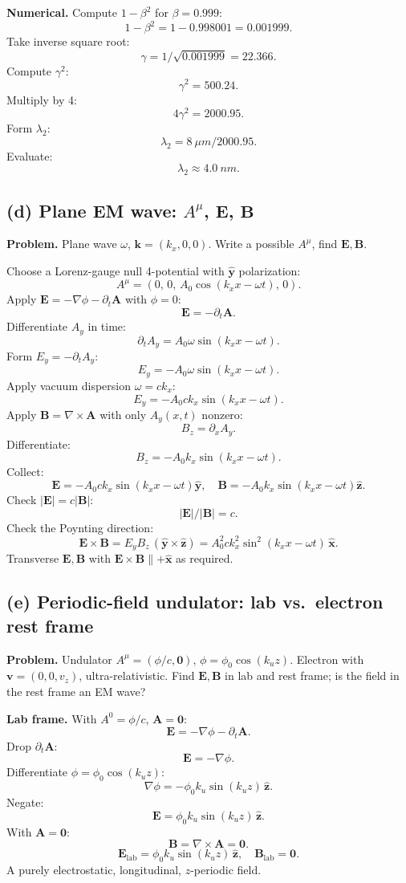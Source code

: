 \documentclass[11pt]{article}
\begin{document}
\noindent\textbf{Numerical.} Compute $1-\beta^2$ for $\beta=0.999$:
\[ 1-\beta^2 = 1-0.998001 = 0.001999. \]
Take inverse square root:
\[ \gamma = 1/\sqrt{0.001999} = 22.366. \]
Compute $\gamma^2$:
\[ \gamma^2 = 500.24. \]
Multiply by 4:
\[ 4\gamma^2 = 2000.95. \]
Form $\lambda_2$:
\[ \lambda_2 = \SI{8}{\mu m}/2000.95. \]
Evaluate:
\[ \boxed{\;\lambda_2 \approx \SI{4.0}{nm}.\;} \]

\subsection*{(d) Plane EM wave: $A^\mu$, $\bm E$, $\bm B$}

\textbf{Problem.} Plane wave $\omega$, $\bm k=(k_x,0,0)$. Write a possible $A^\mu$, find $\bm E,\bm B$.

Choose a Lorenz-gauge null 4-potential with $\hat{\bm y}$ polarization:
\[ A^\mu = (0,\, 0,\, A_0\cos(k_x x - \omega t),\, 0). \]
Apply $\bm E = -\nabla\phi - \partial_t\bm A$ with $\phi=0$:
\[ \bm E = -\partial_t\bm A. \]
Differentiate $A_y$ in time:
\[ \partial_t A_y = A_0\omega\sin(k_x x-\omega t). \]
Form $E_y = -\partial_t A_y$:
\[ E_y = -A_0\omega\sin(k_x x-\omega t). \]
Apply vacuum dispersion $\omega = ck_x$:
\[ E_y = -A_0 c k_x \sin(k_x x-\omega t). \]
Apply $\bm B = \nabla\times\bm A$ with only $A_y(x,t)$ nonzero:
\[ B_z = \partial_x A_y. \]
Differentiate:
\[ B_z = -A_0 k_x \sin(k_x x-\omega t). \]
Collect:
\[ \boxed{\;\bm E = -A_0 c k_x \sin(k_x x-\omega t)\hat{\bm y},\quad \bm B = -A_0 k_x \sin(k_x x-\omega t)\hat{\bm z}.\;} \]
Check $|\bm E|=c|\bm B|$:
\[ |\bm E|/|\bm B| = c. \]
Check the Poynting direction:
\[ \bm E\times\bm B = E_y B_z\,(\hat{\bm y}\times\hat{\bm z}) = A_0^2 c k_x^2\sin^2(k_x x-\omega t)\,\hat{\bm x}. \]
Transverse $\bm E,\bm B$ with $\bm E\times\bm B \parallel +\hat{\bm x}$ as required.

\subsection*{(e) Periodic-field undulator: lab vs.\ electron rest frame}

\textbf{Problem.} Undulator $A^\mu = (\phi/c,\bm 0)$, $\phi=\phi_0\cos(k_u z)$. Electron with $\bm v=(0,0,v_z)$, ultra-relativistic. Find $\bm E,\bm B$ in lab and rest frame; is the field in the rest frame an EM wave?

\textbf{Lab frame.} With $A^0 = \phi/c$, $\bm A = \bm 0$:
\[ \bm E = -\nabla\phi - \partial_t\bm A. \]
Drop $\partial_t\bm A$:
\[ \bm E = -\nabla\phi. \]
Differentiate $\phi = \phi_0\cos(k_u z)$:
\[ \nabla\phi = -\phi_0 k_u\sin(k_u z)\,\hat{\bm z}. \]
Negate:
\[ \bm E = \phi_0 k_u\sin(k_u z)\,\hat{\bm z}. \]
With $\bm A = \bm 0$:
\[ \bm B = \nabla\times\bm A = \bm 0. \]
\[ \boxed{\;\bm E_\text{lab} = \phi_0 k_u\sin(k_u z)\,\hat{\bm z},\quad \bm B_\text{lab}=\bm 0.\;} \]
A purely electrostatic, longitudinal, $z$-periodic field.
\end{document}
